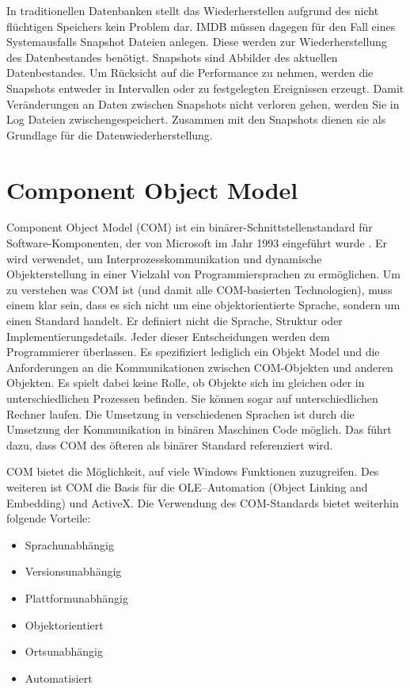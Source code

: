 In traditionellen Datenbanken stellt das Wiederherstellen aufgrund des nicht flüchtigen Speichers kein Problem dar. IMDB müssen dagegen für den Fall eines Systemausfalls Snapshot Dateien anlegen. Diese werden zur Wiederherstellung des Datenbestandes benötigt. Snapshots sind Abbilder des aktuellen Datenbestandes. Um Rücksicht auf die Performance zu nehmen, werden die Snapshots entweder in Intervallen oder zu festgelegten Ereignissen erzeugt. Damit Veränderungen an Daten zwischen Snapshots nicht verloren gehen, werden Sie in Log Dateien zwischengespeichert. Zusammen mit den Snapshots dienen sie als Grundlage für die Datenwiederherstellung. 

\section{Component Object Model}
\label{ch:grundlagen:sec:ComponentObjectModel}

Component Object Model (COM) ist ein binärer-Schnittstellenstandard für Software-Komponenten, der von Microsoft im Jahr 1993 eingeführt wurde \cite{SWB-088582566}. Er wird verwendet, um Interprozesskommunikation und dynamische Objekterstellung in einer Vielzahl von Programmiersprachen zu ermöglichen. Um zu verstehen was COM ist (und damit alle COM-basierten Technologien), muss einem klar sein, dass es sich nicht um eine objektorientierte Sprache, sondern um einen Standard handelt. Er definiert nicht die Sprache, Struktur oder Implementierungsdetails. Jeder dieser Entscheidungen werden dem Programmierer überlassen. Es spezifiziert lediglich ein Objekt Model und die Anforderungen an die Kommunikationen zwischen COM-Objekten und anderen Objekten. Es spielt dabei keine Rolle, ob Objekte sich im gleichen oder in unterschiedlichen Prozessen befinden. Sie können sogar auf unterschiedlichen Rechner laufen. Die Umsetzung in verschiedenen Sprachen ist durch die Umsetzung der Kommunikation in binären Maschinen Code möglich. Das führt dazu, dass COM des öfteren als binärer Standard referenziert wird.

COM bietet die Möglichkeit, auf viele Windows Funktionen zuzugreifen. Des weiteren ist COM die Basis für die OLE–Automation (Object Linking and Embedding) und ActiveX. Die Verwendung des COM-Standards bietet weiterhin folgende Vorteile:

\begin{itemize}
\item Sprachunabhängig
\item Versionsunabhängig
\item Plattformunabhängig
\item Objektorientiert
\item Ortsunabhängig
\item Automatisiert
\end{itemize} 

